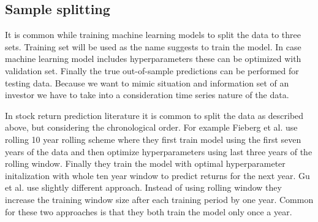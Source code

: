 \documentclass{article}
\begin{document}
\subsection{Sample splitting} \label{SampleSplitting}

It is common while training machine learning models to split the data to three sets. Training set will be used as the name suggests to train the model. In case machine learning model includes hyperparameters these can be optimized with validation set. Finally the true out-of-sample predictions can be performed for testing data. Because we want to mimic situation and information set of an investor we have to take into a consideration time series nature of the data. \par

In stock return prediction literature it is common to split the data as described above, but considering the chronological order. For example Fieberg et al. \citeyear{Fieberg} use rolling 10 year rolling scheme where they first train model using the first seven years of the data and then optimize hyperparameters using last three years of the rolling window. Finally they train the model with optimal hyperparameter initalization with whole ten year window to predict returns for the next year. Gu et al. \citeyear{guetal} use slightly different approach. Instead of using rolling window they increase the training window size after each training period by one year. Common for these two approaches is that they both train the model only once a year. \par
\end{document}
